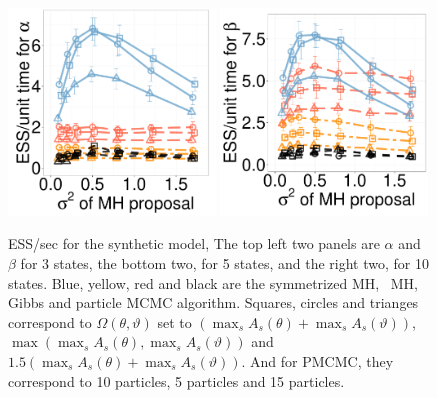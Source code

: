 \begin{figure}[H]
  \begin{minipage}[h!]{0.49\linewidth}
  \centering
    \includegraphics [width=0.49\textwidth, angle=0]{figs/new_whole_exp_figs/exp_alpha_dim5.pdf}
    \includegraphics [width=0.49\textwidth, angle=0]{figs/new_whole_exp_figs/exp_beta_dim5.pdf}
  \end{minipage}
  \begin{minipage}[!hp]{0.49\linewidth}
    \caption{ESS/sec for the synthetic model, The top left two panels are $\alpha$ and $\beta$ for 3 states, the bottom two, for 5 states, and the right two, for 10 states. Blue, yellow, red and black are the symmetrized MH, \naive\ MH, Gibbs and particle MCMC algorithm.  Squares, circles and trianges correspond to $\Omega(\theta,\vartheta)$ set to $(\max_s A_s(\theta) + \max_s A_s(\vartheta))$, $\max(\max_s A_s(\theta), \max_s A_s(\vartheta))$ and  $1.5(\max_s A_s(\theta) + \max_s A_s(\vartheta))$. And for PMCMC, they correspond to 10 particles, 5 particles and 15 particles.}
     \label{fig:ESS_EXP}
  \end{minipage}
  \end{figure}


